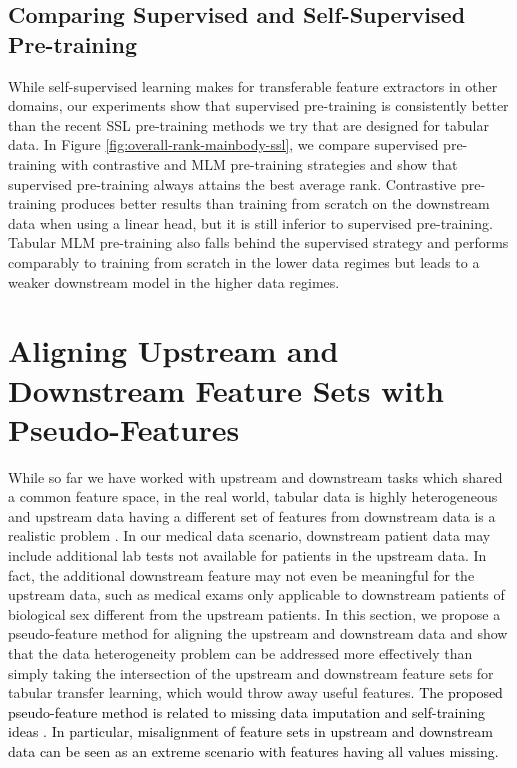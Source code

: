 \subsection{Comparing Supervised and Self-Supervised Pre-training}

While self-supervised learning makes for transferable feature extractors in other domains, our experiments show that supervised pre-training is consistently better than the recent SSL pre-training methods we try that are designed for tabular data. In Figure \ref{fig:overall-rank-mainbody-ssl}, we compare supervised pre-training with contrastive and MLM pre-training strategies and show that supervised pre-training always attains the best average rank.  Contrastive pre-training produces better results than training from scratch on the downstream data when using a linear head, but it is still inferior to supervised pre-training. Tabular MLM pre-training also falls behind the supervised strategy and performs comparably to training from scratch in the lower data regimes but leads to a weaker downstream model in the higher data regimes. 

\section{Aligning Upstream and Downstream Feature Sets with Pseudo-Features}\label{mainbody: pseudo-feature}
\label{sec:imputation}
While so far we have worked with upstream and downstream tasks which shared a common feature space, in the real world, tabular data is highly heterogeneous and upstream data having a different set of features from downstream data is a realistic problem \citep{lewinson2020python}. In our medical data scenario, downstream patient data may include additional lab tests not available for patients in the upstream data. In fact, the additional downstream feature may not even be meaningful for the upstream data, such as medical exams only applicable to downstream patients of biological sex different from the upstream patients. In this section, we propose a pseudo-feature method for aligning the upstream and downstream data and show that the data heterogeneity problem can be addressed more effectively than simply taking the intersection of the upstream and downstream feature sets for tabular transfer learning, which would throw away useful features. \textcolor{black}{The proposed pseudo-feature method is related to missing data imputation \cite{zhang2008missing, sefidian2019missing, yoon2018gain} and self-training ideas \cite{tanha2017semi}. In particular, misalignment of feature sets in upstream and downstream data can be seen as an extreme scenario with features having all values missing.} 

